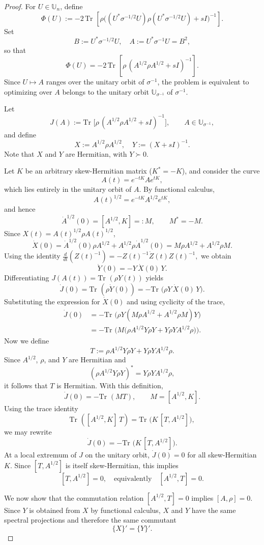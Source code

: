 \documentclass[10pt,reqno]{amsart}
\theoremstyle{break-italic}
\theoremstyle{break-italic}
\theoremstyle{break-italic}
\theoremstyle{break-italic}
\theoremstyle{break-italic}
\theoremstyle{break-italic}
\theoremstyle{break-italic}
\theoremstyle{break-italic}
\theoremstyle{break-roman}
\theoremstyle{standard}
\theoremstyle{varthm-roman}
\theoremstyle{varthm-italic}
\theoremstyle{varthm-roman-break}
\theoremstyle{varthm-italic-break}
\theoremstyle{varthm-roman-no-punctuation}
\theoremstyle{varthm-italic-no-punctuation}
\numberwithin{equation}{section}
\def\Tr{\text{Tr }}
\begin{document}
\begin{proof} 
For $U\in\mathbb U_n$, define
$$
\Phi(U)
:=
-2\,\Tr\!\left[
\rho\Big((U^*\sigma^{-1/2}U)\rho(U^*\sigma^{-1/2}U)+sI\Big)^{-1}
\right].
$$
Set
$$ B:=U^*\sigma^{-1/2}U,\quad A:=U^*\sigma^{-1}U=B^2,$$
so that
\[
\Phi(U)=-2\,\Tr\!\left[\rho\,(A^{1/2}\rho A^{1/2}+sI)^{-1}\right].
\]
Since $U\mapsto A$ ranges over the unitary orbit of $\sigma^{-1}$, the problem is equivalent to optimizing over $A$ belongs to the unitary orbit $\mathbb U_{\sigma^{-1}}$ of $\sigma^{-1}$.

Let
$$
J(A):=\Tr\!\big[\rho\,(A^{1/2}\rho A^{1/2}+sI)^{-1}\big],
\qquad A\in\mathbb U_{\sigma^{-1}},
$$
and define
$$
X:=A^{1/2}\rho A^{1/2},\quad
Y:=(X+sI)^{-1}.
$$
Note that $X$ and $Y$ are Hermitian, with $Y\succ 0$.

Let $K$ be an arbitrary skew-Hermitian matrix ($K^*=-K$), and consider the curve
$$
A(t)=e^{-tK}Ae^{tK},
$$
which lies entirely in the unitary orbit of $A$.
By functional calculus,
$$
A(t)^{1/2}=e^{-tK}A^{1/2}e^{tK},
$$
and hence
$$
\dot A^{1/2}(0)=[A^{1/2},K]=:M,
\qquad M^*=-M.
$$
Since $X(t)=A(t)^{1/2}\rho A(t)^{1/2}$,
$$
\dot X(0)=\dot A^{1/2}(0)\rho A^{1/2}+A^{1/2}\rho\dot A^{1/2}(0)
= M\rho A^{1/2}+A^{1/2}\rho M.
$$
Using the identity
\(
\frac{d}{dt}(Z(t)^{-1})=-Z(t)^{-1}\dot Z(t)Z(t)^{-1},
\)
we obtain
\[
\dot Y(0)=-Y\,\dot X(0)\,Y.
\]
Differentiating $J(A(t))=\Tr(\rho Y(t))$ yields
$$
\dot J(0)
=\Tr(\rho\dot Y(0))
=-\Tr\big(\rho Y\,\dot X(0)\,Y\big).
$$
Substituting the expression for $\dot X(0)$ and using cyclicity of the trace,
\begin{align*}
\dot J(0)
&=-\Tr\big(\rho Y (M\rho A^{1/2}+A^{1/2}\rho M)Y\big)\\
&=-\Tr\Big(M\big(\rho A^{1/2}Y\rho Y+Y\rho Y A^{1/2}\rho\big)\Big).
\end{align*}
Now we define
$$
T:=\rho A^{1/2}Y\rho Y+Y\rho Y A^{1/2}\rho.
$$
Since $A^{1/2}$, $\rho$, and $Y$ are Hermitian and
\[
(\rho A^{1/2}Y\rho Y)^*=Y\rho Y A^{1/2}\rho,
\]
it follows that $T$ is Hermitian. With this definition,
\[
\dot J(0)=-\Tr(MT),
\qquad M=[A^{1/2},K].
\]
Using the trace identity
\[
\Tr([A^{1/2},K]\,T)=\Tr\big(K\,[T,A^{1/2}]\big),
\]
we may rewrite
\[
\dot J(0)=-\Tr\big(K\,[T,A^{1/2}]\big).
\]
At a local extremum of $J$ on the unitary orbit, $\dot J(0)=0$ for all
skew-Hermitian $K$. Since $[T,A^{1/2}]$ is itself skew-Hermitian, this implies
\[
[T,A^{1/2}]=0,
\quad\text{equivalently}\quad
[A^{1/2},T]=0.
\]

We now show that the commutation relation $[A^{1/2},T]=0$ implies $[A,\rho]=0$.
Since $Y$ is obtained from $X$ by functional calculus, $X$ and $Y$ have the same
spectral projections and therefore the same commutant
\[
\{X\}'=\{Y\}'.
\]


\end{proof}
\end{document}
